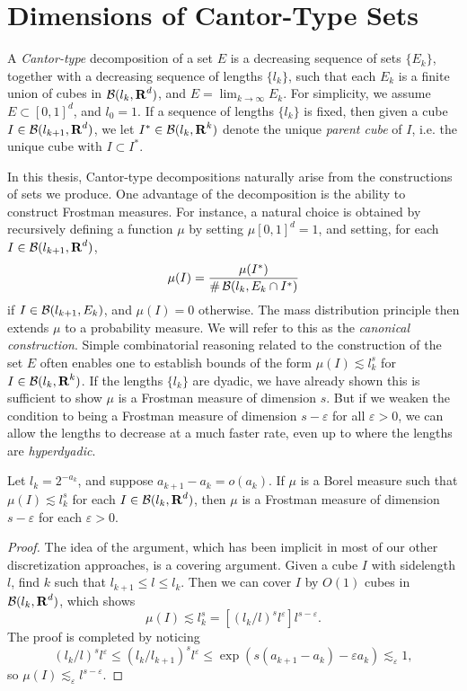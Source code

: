 \section{Dimensions of Cantor-Type Sets}

A \emph{Cantor-type} decomposition of a set $E$ is a decreasing sequence of sets $\{ E_k \}$, together with a decreasing sequence of lengths $\{ l_k \}$, such that each $E_k$ is a finite union of cubes in $\operatorname{\mathcal{B}}(l_k,\operatorname{\mathbf{R}}^d)$, and $E = \lim_{k \to \infty} E_k$. For simplicity, we assume $E \subset [0,1]^d$, and $l_0 = 1$. If a sequence of lengths $\{ l_k \}$ is fixed, then given a cube $I \in \operatorname{\mathcal{B}}(l_{k+1},\operatorname{\mathbf{R}}^d)$, we let $I^* \in \operatorname{\mathcal{B}}(l_k,\operatorname{\mathbf{R}}^k)$ denote the unique \emph{parent cube} of $I$, i.e. the unique cube with $I \subset I^*$.

In this thesis, Cantor-type decompositions naturally arise from the constructions of sets we produce. One advantage of the decomposition is the ability to construct Frostman measures. For instance, a natural choice is obtained by recursively defining a function $\mu$ by setting $\mu[0,1]^d = 1$, and setting, for each $I \in \operatorname{\mathcal{B}}(l_{k+1},\operatorname{\mathbf{R}}^d)$,
%
\[ \mu(I) = \frac{\mu(I^*)}{\# \operatorname{\mathcal{B}}(l_k,E_k \cap I^*)} \]
%
if $I \in \operatorname{\mathcal{B}}(l_{k+1},E_k)$, and $\mu(I) = 0$ otherwise. The mass distribution principle then extends $\mu$ to a probability measure. We will refer to this as the \emph{canonical construction}. Simple combinatorial reasoning related to the construction of the set $E$ often enables one to establish bounds of the form $\mu(I) \lesssim l_k^s$ for $I \in \operatorname{\mathcal{B}}(l_k,\operatorname{\mathbf{R}}^k)$. If the lengths $\{ l_k \}$ are dyadic, we have already shown this is sufficient to show $\mu$ is a Frostman measure of dimension $s$. But if we weaken the condition to being a Frostman measure of dimension $s - \varepsilon$ for all $\varepsilon > 0$, we can allow the lengths to decrease at a much faster rate, even up to where the lengths are \emph{hyperdyadic}.

\begin{theorem} \label{easyCoverTheorem}
	Let $l_k = 2^{-a_k}$, and suppose $a_{k+1} - a_k = o(a_k)$. If $\mu$ is a Borel measure such that $\mu(I) \lesssim l_k^s$ for each $I \in \operatorname{\mathcal{B}}(l_k,\operatorname{\mathbf{R}}^d)$, then $\mu$ is a Frostman measure of dimension $s - \varepsilon$ for each $\varepsilon > 0$.
\end{theorem}
\begin{proof}
	The idea of the argument, which has been implicit in most of our other discretization approaches, is a covering argument. Given a cube $I$ with sidelength $l$, find $k$ such that $l_{k+1} \leq l \leq l_k$. Then we can cover $I$ by $O(1)$ cubes in $\operatorname{\mathcal{B}}(l_k,\operatorname{\mathbf{R}}^d)$, which shows
	\[ \mu(I) \lesssim l_k^s = [(l_k/l)^s l^\varepsilon ] l^{s-\varepsilon}. \]
	The proof is completed by noticing
	\[ (l_k/l)^s l^\varepsilon \leq (l_k/l_{k+1})^s l^\varepsilon \leq \exp(s(a_{k+1} - a_k) - \varepsilon a_k) \lesssim_\varepsilon 1, \]
	so $\mu(I) \lesssim_\varepsilon l^{s-\varepsilon}$.
\end{proof}

